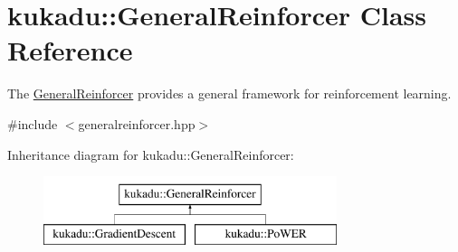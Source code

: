\hypertarget{classkukadu_1_1GeneralReinforcer}{\section{kukadu\-:\-:General\-Reinforcer Class Reference}
\label{classkukadu_1_1GeneralReinforcer}
}


The \hyperlink{classkukadu_1_1GeneralReinforcer}{General\-Reinforcer} provides a general framework for reinforcement learning.  




{\ttfamily \#include $<$generalreinforcer.\-hpp$>$}

Inheritance diagram for kukadu\-:\-:General\-Reinforcer\-:\begin{figure}[H]
\begin{center}
\leavevmode
\includegraphics[height=2.000000cm]{classkukadu_1_1GeneralReinforcer}
\end{center}
\end{figure}
